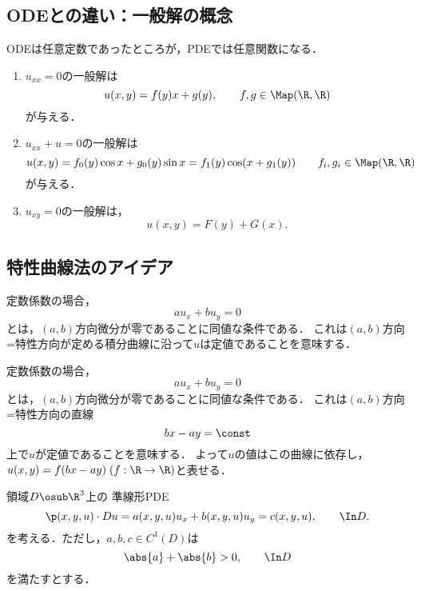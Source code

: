 \documentclass[uplatex,dvipdfmx]{jsreport}
\begin{document}
\subsection{ODEとの違い：一般解の概念}

\begin{tcolorbox}[colframe=ForestGreen, colback=ForestGreen!10!white,breakable,colbacktitle=ForestGreen!40!white,coltitle=black,fonttitle=\bfseries\sffamily,
title=]
    ODEは任意定数であったところが，PDEでは任意関数になる．
\end{tcolorbox}

\begin{example}\mbox{}
    \begin{enumerate}
        \item $u_{xx}=0$の一般解は
        \[u(x,y)=f(y)x+g(y),\qquad f,g\in\Map(\R,\R)\]
        が与える．
        \item $u_{xx}+u=0$の一般解は
        \[u(x,y)=f_0(y)\cos x+g_0(y)\sin x=f_1(y)\cos(x+g_1(y))\qquad f_i,g_i\in\Map(\R,\R)\]
        が与える．
        \item $u_{xy}=0$の一般解は，
        \[u(x,y)=F(y)+G(x).\]
    \end{enumerate}
\end{example}

\subsection{特性曲線法のアイデア}

\begin{tcolorbox}[colframe=ForestGreen, colback=ForestGreen!10!white,breakable,colbacktitle=ForestGreen!40!white,coltitle=black,fonttitle=\bfseries\sffamily,
title=]
    定数係数の場合，
    \[au_x+bu_y=0\]
    とは，$(a,b)$方向微分が零であることに同値な条件である．
    これは$(a,b)$方向=特性方向が定める積分曲線に沿って$u$は定値であることを意味する．
\end{tcolorbox}

\begin{observation}
    定数係数の場合，
    \[au_x+bu_y=0\]
    とは，$(a,b)$方向微分が零であることに同値な条件である．
    これは$(a,b)$方向=特性方向の直線
    \[bx-ay=\const\]
    上で$u$が定値であることを意味する．
    よって$u$の値はこの曲線に依存し，$u(x,y)=f(bx-ay)\;(f:\R\to\R)$と表せる．
\end{observation}

\begin{problem}[2次元上の準線型PDE]
    領域$D\osub\R^3$上の
    準線形PDE
    \[\p(x,y,u)\cdot Du=a(x,y,u)u_x+b(x,y,u)u_y=c(x,y,u),\qquad\In D.\]
    を考える．ただし，$a,b,c\in C^1(D)$は
    \[\abs{a}+\abs{b}>0,\qquad\In D\]
    を満たすとする．
\end{problem}
\end{document}
